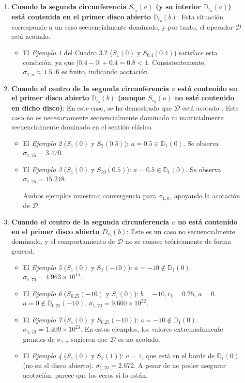 \begin{enumerate}
	\item \textbf{Cuando la segunda circunferencia $S_{r_a}(a)$ (y su interior $\mathbb{D}_{r_a}(a)$) está contenida en el primer disco abierto $\mathbb{D}_{r_b}(b)$}: Esta situación corresponde a un caso secuencialmente dominado, y por tanto, el operador $\mathcal{D}$ está acotado.
	      \begin{itemize}
		      \item El \textit{Ejemplo 1} del Cuadro 3.2 ($S_{1}(0)$ y $S_{0.4}(0.4)$) satisface esta condición, ya que $|0.4-0|+0.4 = 0.8 < 1$. Consistentemente, $\sigma_{1,n} \approx 1.516$ es finito, indicando acotación.
	      \end{itemize}
	\item \textbf{Cuando el centro de la segunda circunferencia $a$ está contenido en el primer disco abierto $\mathbb{D}_{r_b}(b)$ (aunque $S_{r_a}(a)$ no esté contenido en dicho disco)}: En este caso, se ha demostrado que $\mathcal{D}$ está acotado \cite{escribano2025zeros}. Este caso no es necesariamente secuencialmente dominado ni matricialmente secuencialmente dominado en el sentido clásico.
	      \begin{itemize}
		      \item El \textit{Ejemplo 2} ($S_{1}(0)$ y $S_{2}(0.5)$): $a=0.5 \in \mathbb{D}_1(0)$. Se observa $\sigma_{1,25} = 3.470$.
		      \item El \textit{Ejemplo 3} ($S_{1}(0)$ y $S_{10}(0.5)$): $a=0.5 \in \mathbb{D}_1(0)$. Se observa $\sigma_{1,25} = 15.248$.

		            Ambos ejemplos muestran convergencia para $\sigma_{1,n}$, apoyando la acotación de $\mathcal{D}$.
	      \end{itemize}
	\item \textbf{Cuando el centro de la segunda circunferencia $a$ no está contenido en el primer disco abierto $D_{r_b}(b)$}: Este es un caso no secuencialmente dominado, y el comportamiento de $\mathcal{D}$ no se conoce teóricamente de forma general.
	      \begin{itemize}
		      \item El \textit{Ejemplo 5} ($S_{1}(0)$ y $S_{1}(-10)$): $a=-10 \notin \mathbb{D}_1(0)$. $\sigma_{1,70} = 4.963 \times 10^{14}$.
		      \item El \textit{Ejemplo 6} ($S_{0.25}(-10)$ y $S_{1}(0)$): $b=-10, r_b=0.25$, $a=0$. $a=0 \notin \mathbb{D}_{0.25}(-10)$. $\sigma_{1,70} = 9.660 \times 10^{22}$.
		      \item El \textit{Ejemplo 7} ($S_{1}(0)$ y $S_{0.25}(-10)$): $a=-10 \notin \mathbb{D}_1(0)$. $\sigma_{1,70} = 1.409 \times 10^{23}$.
		            En estos ejemplos, los valores extremadamente grandes de $\sigma_{1,n}$ sugieren que $\mathcal{D}$ es no acotado.
		      \item El \textit{Ejemplo 4} ($S_{1}(0)$ y $S_{1}(1)$): $a=1$, que está en el borde de $\mathbb{D}_1(0)$ (no en el disco abierto). $\sigma_{1,70} = 2.672$. A pesar de no poder asegurar acotación, parece que los ceros si lo están.
	      \end{itemize}
\end{enumerate}

